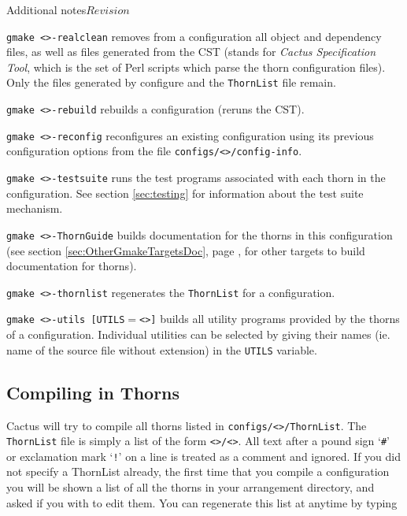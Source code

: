 \begin{cactuspart}{Additional notes}{}{$Revision$}
\begin{Lentry}
\item [\texttt{gmake <\var{config}>-realclean}] removes from a configuration
all object and dependency files, as well as files generated from the
CST (stands for \textit{Cactus Specification Tool}, which is the set of Perl scripts
which parse the thorn configuration files).  Only the files generated
by configure and the \texttt{ThornList} file remain.

\item [\texttt{gmake <\var{config}>-rebuild}] rebuilds a configuration (reruns the CST).

\item [\texttt{gmake <\var{config}>-reconfig}] reconfigures an existing
configuration using its previous configuration options from the file
\texttt{configs/<>/config-info}.

\item [\texttt{gmake <\var{config}>-testsuite}] runs the test programs
associated with each thorn in the configuration. See section
\ref{sec:testing} for information about the test suite mechanism.

\item[\texttt{gmake <\var{config}>-ThornGuide}] builds documentation for the
thorns in this configuration
  (see section \ref{sec:OtherGmakeTargetsDoc}, page
  \pageref{sec:OtherGmakeTargetsDoc}, for other targets to build documentation
  for thorns).

\item [\texttt{gmake <\var{config}>-thornlist}] regenerates the
\texttt{ThornList} for a configuration.

\item [\texttt{gmake <\var{config}>-utils [UTILS$=$<\var{list}>]}] builds all
utility programs provided by the thorns of a configuration. Individual
utilities can be selected by giving their names (ie. name of the source file without extension) in the \texttt{UTILS} variable.

\end{Lentry}



\subsection{Compiling in Thorns}
\label{sec:cointh}

Cactus will try to compile all thorns listed in
\texttt{configs/<>/ThornList}.
The \texttt{ThornList} file is simply a list of the form
\texttt{<>/<>}.  All text after a pound sign
`\texttt{\#}' or exclamation mark `\texttt{!}'
on a line is treated as a comment and ignored.
If you did
not specify a ThornList already, the first time that you compile a configuration
you will be shown a list of all the thorns in your arrangement
directory, and asked if you with to edit them. You can regenerate
this list at anytime by typing


\end{cactuspart}
